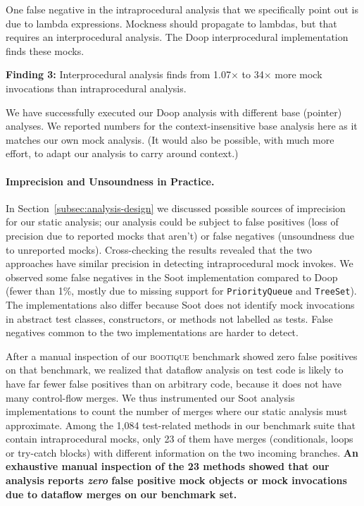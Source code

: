 One false negative in the intraprocedural analysis that we specifically point out is due to lambda expressions. Mockness should propagate to lambdas, but that requires an interprocedural analysis. The Doop interprocedural implementation finds these mocks.


\begin{mdframed}[
	leftmargin=\parindent,
	rightmargin=\parindent,
	skipabove=\topsep,
	skipbelow=\topsep
	]
	{\bf Finding 3:} Interprocedural analysis finds from 1.07$\times$ to 34$\times$ more mock invocations than intraprocedural analysis.
\end{mdframed}

We have successfully executed our Doop analysis with different base (pointer) analyses. We reported numbers for the context-insensitive base analysis here as it matches our own mock analysis. (It would also be possible, with much more effort, to adapt our analysis to carry around context.)

\paragraph{Imprecision and Unsoundness in Practice.} In Section~\ref{subsec:analysis-design} we discussed possible sources of imprecision for our static analysis; our analysis could be subject to false positives (loss of precision due to reported mocks that aren't) or false negatives (unsoundness due to unreported mocks). Cross-checking the results revealed that the two approaches have similar precision in detecting intraprocedural mock invokes. We observed some false negatives in the Soot implementation compared to Doop (fewer than 1\%, mostly due to missing support for \texttt{PriorityQueue} and \texttt{TreeSet}). The implementations also differ because Soot does not identify mock invocations in abstract test classes, constructors, or methods not labelled as tests. False negatives common to the two implementations are harder to detect.

After a manual inspection of our \textsc{bootique} benchmark showed zero false positives on that benchmark, we realized that dataflow analysis on test code is likely to have far fewer false positives than on arbitrary code, because it does not have many control-flow merges. We thus instrumented our Soot analysis implementations to count the number of merges where our static analysis must approximate. Among the 1,084 test-related methods in our benchmark suite that contain intraprocedural mocks, only 23 of them have merges (conditionals, loops or try-catch blocks) with different information on the two incoming branches.  {\bf An exhaustive manual inspection of the 23 methods showed that our analysis reports \emph{zero} false positive mock objects or mock invocations due to dataflow merges on our benchmark set.}

